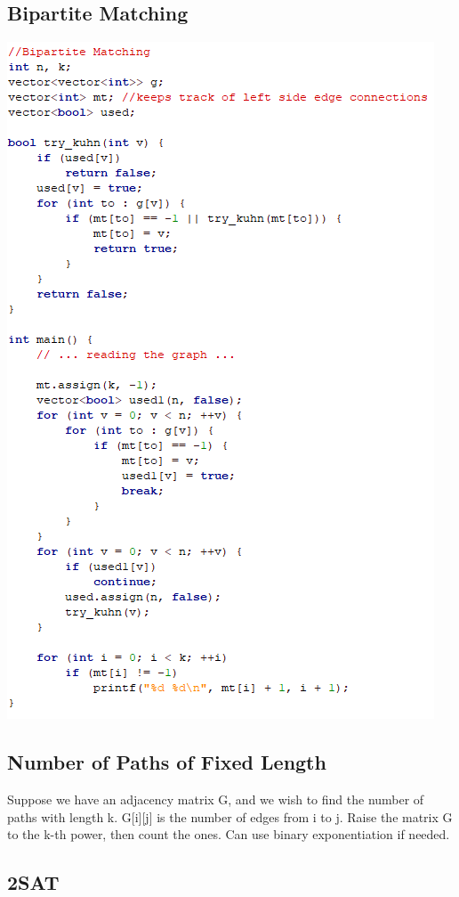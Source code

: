 \documentclass[11pt,twocolumn]{article}
\begin{document}
\subsection{Bipartite Matching}


\includegraphics[scale=0.6]{bipartitematchign}

\subsection{Number of Paths of Fixed Length}
Suppose we have an adjacency matrix G, and we wish to find the number of paths with length k. G[i][j] is the number of edges from i to j. Raise the matrix G to the k-th power, then count the ones. Can use binary exponentiation if needed.
\subsection{2SAT}
\end{document}
